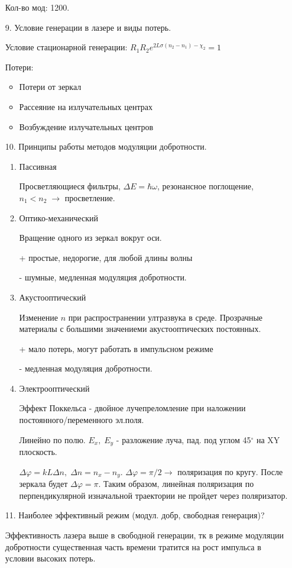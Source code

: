 \documentclass[a4paper]{article}
\begin{document}
\begin{itemize}
		Кол-во мод: 1200.
	\item[9.] Условие генерации в лазере и виды потерь. \par 
		Условие стационарной генерации: $R_1R_2 e^{2L\sigma(n_2-n_1)-\chi_2} = 1$ \par 
		Потери: 
		\begin{itemize}
			\item Потери от зеркал
			\item Рассеяние на излучательных центрах
			\item Возбуждение излучательных центров
		\end{itemize}
	\item[10.] Принципы работы методов модуляции добротности. \par 
		\begin{enumerate}
			\item Пассивная \par 
				Просветляющиеся фильтры, $\Delta E = \hbar \omega$, резонансное поглощение, $n_1<n_2\; \rightarrow$ просветление.
			\item Оптико-механический  \par 
				Вращение одного из зеркал вокруг оси. \par 
				+ простые, недорогие, для любой длины волны \par 
				- шумные, медленная модуляция добротности.
			\item Акустооптический \par 
				Изменение $n$ при распространении ултразвука в среде. Прозрачные материалы с большими значениеми
				акустооптических постоянных. \par 
				+ мало потерь, могут работать в импульсном режиме \par 
				- медленная модуляция добротности.
			\item Электрооптический \par 
				Эффект Поккельса - двойное лучепреломление при наложении постоянного/переменного эл.поля. \par 
				Линейно по полю. $E_x,\; E_y$ - разложение луча, пад. под углом 45$^{\circ}$ на XY плоскость. \par 
				$\Delta \varphi = k L \Delta n, \; \Delta n = n_x - n_y$. $\Delta \varphi= \pi/2 \rightarrow $ поляризация по кругу. После зеркала будет $\Delta \varphi = \pi$. Таким образом,
				линейная поляризация по перпендикулярной изначальной траектории не пройдет через поляризатор.
		\end{enumerate}
	\item[11.] Наиболее эффективный режим (модул. добр, свободная генерация)? \par 
		Эффективность лазера выше в свободной генерации, тк в режиме модуляции добротности существенная часть времени тратится на рост импульса в условии высоких потерь.
\end{itemize}
\end{document}
